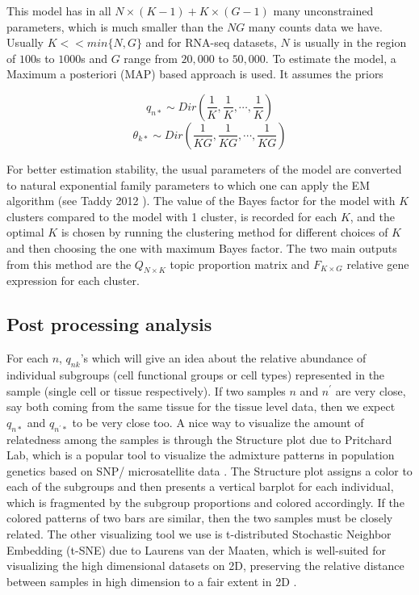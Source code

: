 This model has in all $N \times (K-1) + K \times (G-1)$ many unconstrained parameters, which is much smaller than the $NG$ many counts data we have. Usually $K << min \{N,G \} $ and for RNA-seq datasets, $N$ is usually in the region of $100$s to $1000$s  and $G$ range from $20,000$ to $50,000$.  To estimate the model, a Maximum a posteriori (MAP) based approach is used. It assumes the priors

$$ q_{n*} \sim Dir ( \frac{1}{K}, \frac{1}{K}, \cdots, \frac{1}{K} ) $$
$$ \theta_{k*} \sim Dir(\frac{1}{KG}, \frac{1}{KG}, \cdots, \frac{1}{KG} ) $$

For better estimation stability, the usual parameters of the model are converted to natural exponential family parameters to which one can apply the EM algorithm (see Taddy 2012 \cite{Taddy2012}). The value of the Bayes factor for the model with $K$ clusters compared to the model with 1 cluster, is recorded for each $K$, and the optimal $K$ is chosen by running the clustering method for different choices of $K$ and then choosing the one with maximum Bayes factor. The two main outputs from this method are the $Q_{N \times K}$ topic proportion matrix  and $F_{K \times G}$ relative gene expression for each cluster.

\subsection{Post processing analysis}

For each $n$, $q_{nk}$'s which will give an idea about the relative abundance of individual subgroups (cell functional groups or cell types) represented in the sample (single cell or tissue respectively). If two samples $n$ and $n^{'}$ are very close, say both coming from the same tissue for the tissue level data, then we expect $q_{n*}$ and $q_{n^{'}*}$ to be very close too. A nice way to visualize the amount of relatedness among the samples is through the Structure plot due to Pritchard Lab, which is a popular tool to visualize the admixture patterns in population genetics based on SNP/ microsatellite data \cite{Pritchard2000} \cite{Raj2014}. The Structure plot  assigns a color to each of the subgroups and then presents a vertical barplot for each individual, which is fragmented by the subgroup proportions and colored accordingly. If the colored patterns of two bars are similar, then the two samples must be closely related. The other visualizing tool we use is t-distributed Stochastic Neighbor Embedding (t-SNE) due to Laurens van der Maaten, which is well-suited for visualizing the high dimensional datasets on 2D, preserving the relative distance between samples in high dimension to a fair extent in 2D \cite{Maaten2008} \cite{Maaten2014}.  

